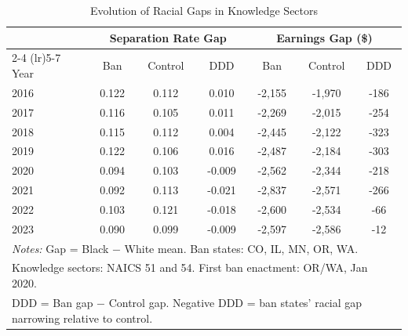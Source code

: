 \begin{table}[t]
\centering
\caption{Evolution of Racial Gaps in Knowledge Sectors}
\label{tab:gaps}
\small
\begin{tabular}{lcccccc}
\hline\hline
 & \multicolumn{3}{c}{Separation Rate Gap} & \multicolumn{3}{c}{Earnings Gap (\$)} \\
\cmidrule(lr){2-4} \cmidrule(lr){5-7}
Year & Ban & Control & DDD & Ban & Control & DDD \\
\hline
2016 & 0.122 & 0.112 & 0.010 & -2,155 & -1,970 & -186 \\
2017 & 0.116 & 0.105 & 0.011 & -2,269 & -2,015 & -254 \\
2018 & 0.115 & 0.112 & 0.004 & -2,445 & -2,122 & -323 \\
2019 & 0.122 & 0.106 & 0.016 & -2,487 & -2,184 & -303 \\
2020 & 0.094 & 0.103 & -0.009 & -2,562 & -2,344 & -218 \\
2021 & 0.092 & 0.113 & -0.021 & -2,837 & -2,571 & -266 \\
2022 & 0.103 & 0.121 & -0.018 & -2,600 & -2,534 & -66 \\
2023 & 0.090 & 0.099 & -0.009 & -2,597 & -2,586 & -12 \\
\hline
\multicolumn{7}{l}{\footnotesize \textit{Notes:} Gap = Black $-$ White mean. Ban states: CO, IL, MN, OR, WA.}\\
\multicolumn{7}{l}{\footnotesize Knowledge sectors: NAICS 51 and 54. First ban enactment: OR/WA, Jan 2020.}\\
\multicolumn{7}{l}{\footnotesize DDD = Ban gap $-$ Control gap. Negative DDD = ban states' racial gap narrowing relative to control.}\\
\hline\hline
\end{tabular}
\end{table}
